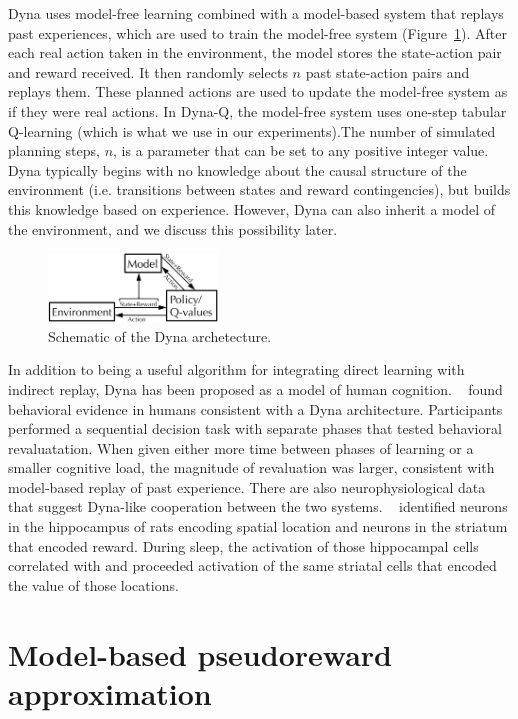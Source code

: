 \documentclass[letterpaper]{article}
\begin{document}
Dyna uses model-free learning combined with a model-based system that replays past experiences, which are used to train the model-free system (Figure~\ref{fig:dyna_schematic}). After each real action taken in the environment, the model stores the state-action pair and reward received. It then randomly selects $n$ past state-action pairs and replays them. These planned actions are used to update the model-free system as if they were real actions. In Dyna-Q, the model-free system uses one-step tabular Q-learning (which is what we use in our experiments).The number of simulated planning steps, $n$, is a parameter that can be set to any positive integer value. Dyna typically begins with no knowledge about the causal structure of the environment (i.e. transitions between states and reward contingencies), but builds this knowledge based on experience. However, Dyna can also inherit a model of the environment, and we discuss this possibility later.

\begin{figure}[ht]
\centering
\includegraphics[width=0.4\textwidth]{dyna_schematic}
\caption{Schematic of the Dyna archetecture.}
\label{fig:dyna_schematic}
\end{figure}

In addition to being a useful algorithm for integrating direct learning with indirect replay, Dyna has been proposed as a model of human cognition. ~\cite{gershman2014retrospective} found behavioral evidence in humans consistent with a Dyna architecture. Participants performed a sequential decision task with separate phases that tested behavioral revaluatation. When given either more time between phases of learning or a smaller cognitive load, the magnitude of revaluation was larger, consistent with model-based replay of past experience. There are also neurophysiological data that suggest Dyna-like cooperation between the two systems. ~\cite{lansink2009hippocampus} identified neurons in the hippocampus of rats encoding spatial location and neurons in the striatum that encoded reward. During sleep, the activation of those hippocampal cells correlated with and proceeded activation of the same striatal cells that encoded the value of those locations.

\section{Model-based pseudoreward approximation}
\end{document}
